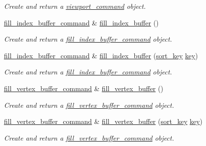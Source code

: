\begin{DoxyCompactItemize}
\begin{DoxyCompactList}\small\item\em Create and return a \mbox{\hyperlink{classmoka_1_1viewport__command}{viewport\+\_\+command}} object. \end{DoxyCompactList}\item 
\mbox{\hyperlink{classmoka_1_1fill__index__buffer__command}{fill\+\_\+index\+\_\+buffer\+\_\+command}} \& \mbox{\hyperlink{classmoka_1_1command__list_aa845295c19241a778a47ff27ac38c912}{fill\+\_\+index\+\_\+buffer}} ()
\begin{DoxyCompactList}\small\item\em Create and return a \mbox{\hyperlink{classmoka_1_1fill__index__buffer__command}{fill\+\_\+index\+\_\+buffer\+\_\+command}} object. \end{DoxyCompactList}\item 
\mbox{\hyperlink{classmoka_1_1fill__index__buffer__command}{fill\+\_\+index\+\_\+buffer\+\_\+command}} \& \mbox{\hyperlink{classmoka_1_1command__list_a596b79fc1a99395c25d3aec80309cf6d}{fill\+\_\+index\+\_\+buffer}} (\mbox{\hyperlink{namespacemoka_afa30a616e67b83113ebdb857555cf2bb}{sort\+\_\+key}} \mbox{\hyperlink{namespacemoka_a45a36b05a9b9eddb028d6c60305ae71d}{key}})
\begin{DoxyCompactList}\small\item\em Create and return a \mbox{\hyperlink{classmoka_1_1fill__index__buffer__command}{fill\+\_\+index\+\_\+buffer\+\_\+command}} object. \end{DoxyCompactList}\item 
\mbox{\hyperlink{classmoka_1_1fill__vertex__buffer__command}{fill\+\_\+vertex\+\_\+buffer\+\_\+command}} \& \mbox{\hyperlink{classmoka_1_1command__list_a97e4a16edf37b62eff5de88fae1d146e}{fill\+\_\+vertex\+\_\+buffer}} ()
\begin{DoxyCompactList}\small\item\em Create and return a \mbox{\hyperlink{classmoka_1_1fill__vertex__buffer__command}{fill\+\_\+vertex\+\_\+buffer\+\_\+command}} object. \end{DoxyCompactList}\item 
\mbox{\hyperlink{classmoka_1_1fill__vertex__buffer__command}{fill\+\_\+vertex\+\_\+buffer\+\_\+command}} \& \mbox{\hyperlink{classmoka_1_1command__list_a7f312a45afd5eca984eee0210f4e4e51}{fill\+\_\+vertex\+\_\+buffer}} (\mbox{\hyperlink{namespacemoka_afa30a616e67b83113ebdb857555cf2bb}{sort\+\_\+key}} \mbox{\hyperlink{namespacemoka_a45a36b05a9b9eddb028d6c60305ae71d}{key}})
\begin{DoxyCompactList}\small\item\em Create and return a \mbox{\hyperlink{classmoka_1_1fill__vertex__buffer__command}{fill\+\_\+vertex\+\_\+buffer\+\_\+command}} object. \end{DoxyCompactList}\item 

\end{DoxyCompactItemize}
